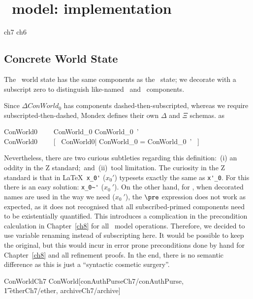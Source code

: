 \chapter{\Conc\ model: implementation}\label{ch7}

\begin{zsection}
  \SECTION ch7 \parents ch6
\end{zsection}

\section{Concrete World State}

The \Conc\ world state has the same components as the \Betw\ state;
we decorate with a subscript zero to distinguish like-named \Betw\
and \Conc\ components.

Since $\Delta ConWorld_0$ has components dashed-then-subscripted,
whereas we require subscripted-then-dashed, Mondex defines their own
$\Delta$ and $\Xi$ schemas. as
\newcommand{\DeltaConWorldO}{\Delta ConWorld0}
\newcommand{\XiConWorldO}{\Xi ConWorld0}
%
\begin{gzed}
  \DeltaConWorldO ~~~~ ConWorld_0 \land ConWorld_0~' \\
  \XiConWorldO ~~\defs~~ [~ \DeltaConWorldO | \theta ConWorld_0 = \theta ConWorld_0~' ~]
\end{gzed}
%
Nevertheless, there are two curious subtleties regarding this
definition:~(i) an oddity in the Z standard;~and~(ii)~tool
limitation. The curiosity in the Z standard is that in \LaTeX\
\verb+x_0'+ ($x_0'$) typesets exactly the same as \verb+x'_0+. For
this there is an easy solution: \verb+x_0~'+ ($x_0~'$). On the other
hand, for \zeves, when decorated names are used in the way we need
($x_0~'$), the $\pre$ expression does not work as expected, as it
does not recognised that all subscribed-primed components need to be
existentially quantified. This introduces a complication in the
precondition calculation in Chapter~\ref{ch8} for all \Conc\ model
operations. Therefore, we decided to use variable renaming instead
of subscripting here. It would be possible to keep the original, but
this would incur in error prone preconditions done by hand for
Chapter~\ref{ch8} and all refinement proofs. In the end, there is no
semantic difference as this is just a ``syntactic cosmetic
surgery''.

\begin{LNewSDef}
\begin{zed}
    ConWorldCh7  ConWorld[conAuthPurseCh7/conAuthPurse, \\
                \t1 etherCh7/ether, archiveCh7/archive]
\end{zed}~\end{LNewSDef}

